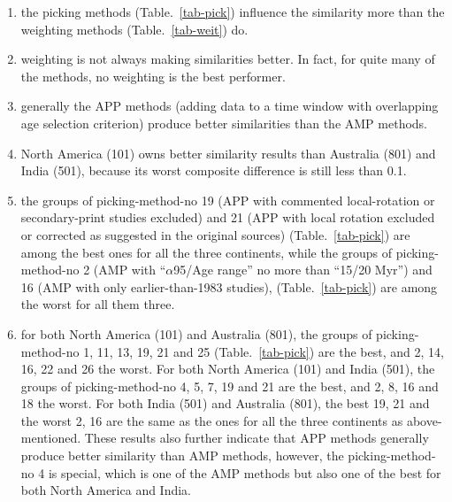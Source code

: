 \begin{enumerate}
  \item the picking methods (Table.~\ref{tab-pick}) influence the similarity
        more than the weighting methods (Table.~\ref{tab-weit}) do.
  \item weighting is not always making similarities better. In fact, for quite
        many of the methods, no weighting is the best performer.
  \item generally the APP methods (adding data to a time window with overlapping
        age selection criterion) produce better similarities than the AMP
        methods.
  \item North America (101) owns better similarity results than Australia (801)
        and India (501), because its worst composite difference is still less
        than 0.1.
  \item the groups of picking-method-no 19 (APP with commented local-rotation or
        secondary-print studies excluded) and 21 (APP with local rotation
        excluded or corrected as suggested in the original sources)
        (Table.~\ref{tab-pick}) are among the best ones for all the three
        continents, while the groups of picking-method-no 2 (AMP with
        ``$\alpha$95/Age range'' no more than ``15\degree/20 Myr'') and 16 (AMP
        with only earlier-than-1983 studies), (Table.~\ref{tab-pick}) are among
        the worst for all them three.
  \item for both North America (101) and Australia (801), the groups of
        picking-method-no 1, 11, 13, 19, 21 and 25 (Table.~\ref{tab-pick}) are
        the best, and 2, 14, 16, 22 and 26 the worst. For both North America
		(101) and India (501), the groups of picking-method-no 4, 5, 7, 19 and
		21 are the best, and 2, 8, 16 and 18 the worst. For both India (501)
		and Australia (801), the best 19, 21 and the worst 2, 16 are the same as
		the ones for all the three continents as above-mentioned. These results
		also further indicate that APP methods generally produce better
		similarity than AMP methods, however, the picking-method-no 4 is
		special, which is one of the AMP methods but also one of the best for
		both North America and India.
\end{enumerate}

